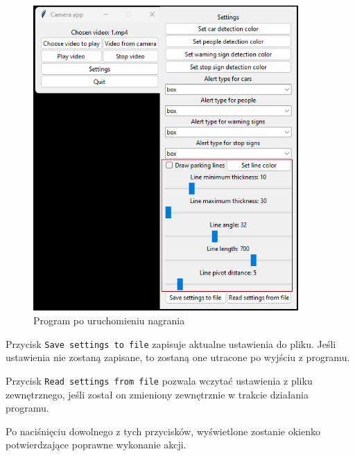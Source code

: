 \begin{figure}[H]
	\centering
	\includegraphics[width=0.9\textwidth]{Img/manual/line_settings.png}
	\caption{Program po uruchomieniu nagrania}
	\label{fig:line_settings}
\end{figure}

\newpage


Przycisk \verb|Save settings to file| zapisuje aktualne ustawienia do pliku. Jeśli ustawienia nie zostaną zapisane, to zostaną one utracone po wyjściu z programu.

Przycisk  \verb|Read settings from file| pozwala wczytać ustawienia z pliku zewnętrznego, jeśli został on zmieniony zewnętrznie w trakcie działania programu.

Po naciśnięciu dowolnego z tych przycisków, wyświetlone zostanie okienko potwierdzające poprawne wykonanie akcji.


